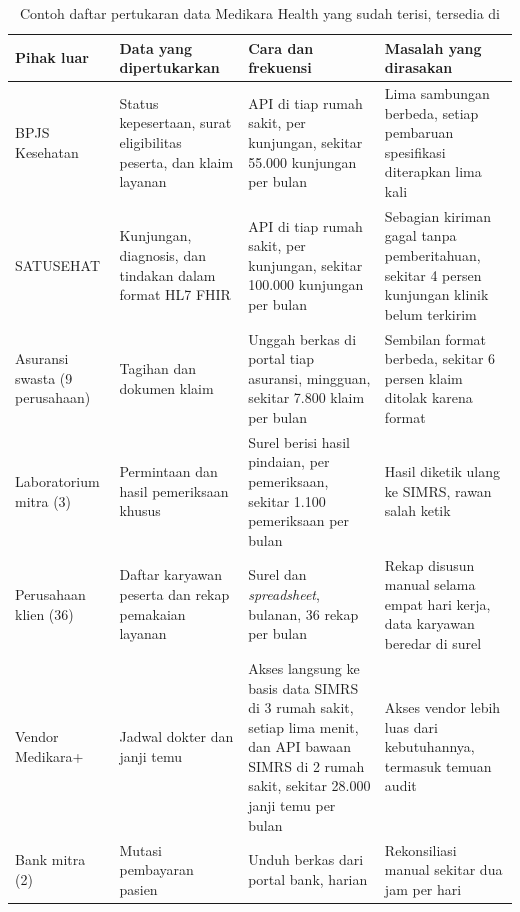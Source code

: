 \begin{table}[!htb]
  \centering
  \caption{Contoh daftar pertukaran data Medikara Health yang sudah terisi,
           tersedia di }
  \label{tab:ch01-contoh-pertukaran}
  {\small
  \begin{tabularx}{\textwidth}{>{\raggedright\arraybackslash}p{2.1cm}
                               >{\raggedright\arraybackslash}X
                               >{\raggedright\arraybackslash}X
                               >{\raggedright\arraybackslash}X}
    \hline
    \textbf{Pihak luar} & \textbf{Data yang dipertukarkan} & \textbf{Cara dan frekuensi} & \textbf{Masalah yang dirasakan} \\
    \hline
    BPJS Kesehatan & Status kepesertaan, surat eligibilitas peserta, dan klaim layanan & API di tiap rumah sakit, per kunjungan, sekitar 55.000 kunjungan per bulan & Lima sambungan berbeda, setiap pembaruan spesifikasi diterapkan lima kali \\
    \hline
    SATUSEHAT & Kunjungan, diagnosis, dan tindakan dalam format HL7 FHIR & API di tiap rumah sakit, per kunjungan, sekitar 100.000 kunjungan per bulan & Sebagian kiriman gagal tanpa pemberitahuan, sekitar 4 persen kunjungan klinik belum terkirim \\
    \hline
    Asuransi swasta (9 perusahaan) & Tagihan dan dokumen klaim & Unggah berkas di portal tiap asuransi, mingguan, sekitar 7.800 klaim per bulan & Sembilan format berbeda, sekitar 6 persen klaim ditolak karena format \\
    \hline
    Laboratorium mitra (3) & Permintaan dan hasil pemeriksaan khusus & Surel berisi hasil pindaian, per pemeriksaan, sekitar 1.100 pemeriksaan per bulan & Hasil diketik ulang ke SIMRS, rawan salah ketik \\
    \hline
    Perusahaan klien (36) & Daftar karyawan peserta dan rekap pemakaian layanan & Surel dan \textit{spreadsheet}, bulanan, 36 rekap per bulan & Rekap disusun manual selama empat hari kerja, data karyawan beredar di surel \\
    \hline
    Vendor Medikara+ & Jadwal dokter dan janji temu & Akses langsung ke basis data SIMRS di 3 rumah sakit, setiap lima menit, dan API bawaan SIMRS di 2 rumah sakit, sekitar 28.000 janji temu per bulan & Akses vendor lebih luas dari kebutuhannya, termasuk temuan audit \\
    \hline
    Bank mitra (2) & Mutasi pembayaran pasien & Unduh berkas dari portal bank, harian & Rekonsiliasi manual sekitar dua jam per hari \\
    \hline
  \end{tabularx}}
\end{table}

